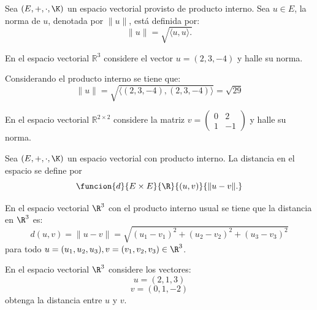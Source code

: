 \documentclass[compacto,10pt]{pubciencias-notas}
\begin{document}
\begin{defi}[Norma]
Sea $(E,+,\cdot,\K)$ un espacio vectorial provisto de producto interno. Sea $u\in E$, la norma de $u$, denotada por $\|u \|$, está definida por:
\[
    \| u\| = \sqrt{\langle  u, u \rangle .}
\]
\end{defi}

\begin{ejem}\hspace{0pt} En el espacio vectorial $\mathbb{R}^{3}$ considere el vector $u=(2,3,-4)$ y halle su norma.\newline

Considerando el producto interno se tiene que:
\[
\| u\| = \sqrt{\langle  (2,3,-4), (2,3,-4) \rangle } = \sqrt{29}
\]
\end{ejem}

\begin{ejer}\hspace{0pt} En el espacio vectorial $\mathbb{R}^{2\times 2}$ considere la matriz $v=\begin{pmatrix}0&2\\1&-1\end{pmatrix}$ y halle su norma.
\end{ejer}

\begin{defi}[Distancia]
Sea $(E,+,\cdot,\K)$ un espacio vectorial con producto interno. La distancia en el espacio se define por
\[
    \funcion{d}{E\times E}{\R}{(u,v)}{\| u - v\|.}
\]
\end{defi}

\begin{ejem}\hspace{0pt} En el espacio vectorial $\R^{3}$ con el producto interno usual se tiene que la distancia en $\R^{3}$ es:
\[
    d(u, v) = \|u - v\| = \sqrt{(u_{1} - v_{1})^{2} + (u_{2} - v_{2})^{2} + (u_{3} - v_{3})^{2}}
\]
para todo $u = (u_{1}, u_{2}, u_{3}), v = (v_{1}, v_{2}, v_{3})\in\R^{3}$.
\end{ejem}


\begin{ejer}\hspace{0pt} En el espacio vectorial $\R^{3}$ considere los vectores:
\[u=(2,1,3)\]
\[v=(0,1,-2)\]
obtenga la distancia entre $u$ y $v$.

\end{ejer}

\end{document}
